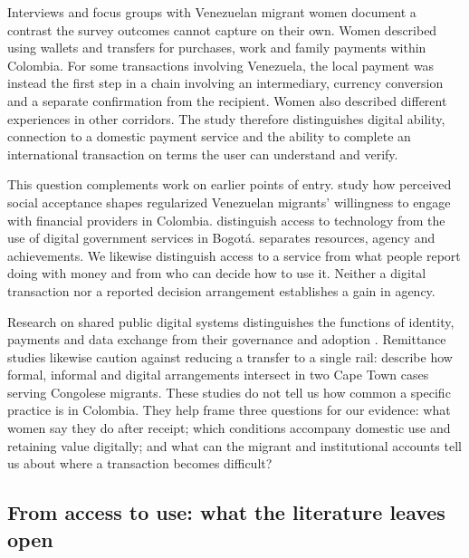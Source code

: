 \documentclass[12pt]{article}
\begin{document}
Interviews and focus groups with Venezuelan migrant women document a contrast the survey outcomes cannot capture on their own. Women described using wallets and transfers for purchases, work and family payments within Colombia. For some transactions involving Venezuela, the local payment was instead the first step in a chain involving an intermediary, currency conversion and a separate confirmation from the recipient. Women also described different experiences in other corridors. The study therefore distinguishes digital ability, connection to a domestic payment service and the ability to complete an international transaction on terms the user can understand and verify.

This question complements work on earlier points of entry. \citet{barboni2025} study how perceived social acceptance shapes regularized Venezuelan migrants' willingness to engage with financial providers in Colombia. \citet{martinshields2022} distinguish access to technology from the use of digital government services in Bogotá. \citet{kabeer1999} separates resources, agency and achievements. We likewise distinguish access to a service from what people report doing with money and from who can decide how to use it. Neither a digital transaction nor a reported decision arrangement establishes a gain in agency.

Research on shared public digital systems distinguishes the functions of identity, payments and data exchange from their governance and adoption \citep{eaves_rao_verified_2025}. Remittance studies likewise caution against reducing a transfer to a single rail: \citet{cirolia_remittance_2022} describe how formal, informal and digital arrangements intersect in two Cape Town cases serving Congolese migrants. These studies do not tell us how common a specific practice is in Colombia. They help frame three questions for our evidence: what women say they do after receipt; which conditions accompany domestic use and retaining value digitally; and what can the migrant and institutional accounts tell us about where a transaction becomes difficult?

\subsection{From access to use: what the literature leaves open}
\end{document}

